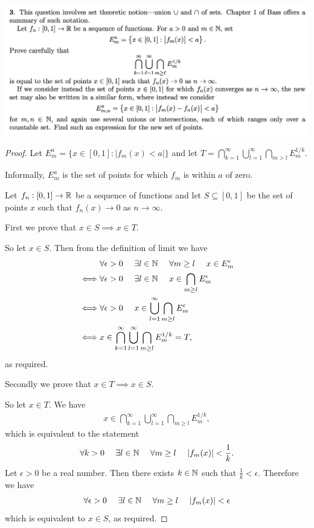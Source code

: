 \newpage
\begin{mdframed}
  \includegraphics[width=400pt]{img/analysis--berkeley-202a--homework-1-8349.png}
\end{mdframed}


\begin{proof}
  Let $E_m^a = \{x \in [0, 1] : |f_m(x) < a|\}$ and let $T = \bigcap_{k=1}^\infty \bigcup_{l=1}^\infty \bigcap_{m > l} E_m^{1/k}$.

  Informally, $E_m^a$ is the set of points for which $f_m$ is within $a$ of zero.

  Let $f_n: [0, 1] \to \mathbb{R}$ be a sequence of functions and let $S \subseteq [0, 1]$ be the set of points $x$
  such that $f_n(x) \to 0$ as $n \to \infty$.

  First we prove that $x \in S \implies x \in T$.

  So let $x \in S$. Then from the definition of limit we have
  \begin{align*}
    &\forall \epsilon>0 ~~~~ \exists l \in \mathbb{N} ~~~~ \forall m \geq l ~~~~  x \in E_m^\epsilon \\
    \iff &\forall \epsilon>0 ~~~~ \exists l \in \mathbb{N} ~~~~                        x \in \bigcap_{m \geq l} E_m^\epsilon \\
    \iff &\forall \epsilon>0 ~~~~                                              x \in \bigcup_{l=1}^\infty \bigcap_{m \geq l} E_m^\epsilon \\
    \iff &                                                              x \in \bigcap_{k=1}^\infty \bigcup_{l=1}^\infty \bigcap_{m \geq l} E_m^{1/k} = T,
  \end{align*}
  as required.

  Secondly we prove that $x \in T \implies x \in S$.

  So let $x \in T$. We have
  \begin{align*}
    x \in \bigcap_{k=1}^\infty \bigcup_{l=1}^\infty \bigcap_{m \geq l} E_m^{1/k},
  \end{align*}
  which is equivalent to the statement
  \begin{align*}
    \forall k>0 ~~~~ \exists l \in \mathbb{N} ~~~~ \forall m \geq l ~~~~  |f_m(x)| < \frac{1}{k}.
  \end{align*}
  Let $\epsilon > 0$ be a real number. Then there exists $k \in \mathbb{N}$ such that $\frac{1}{k} < \epsilon$. Therefore we have
  \begin{align*}
    \forall \epsilon>0 ~~~~ \exists l \in \mathbb{N} ~~~~ \forall m \geq l ~~~~  |f_m(x)| < \epsilon
  \end{align*}
  which is equivalent to $x \in S$, as required.
\end{proof}

